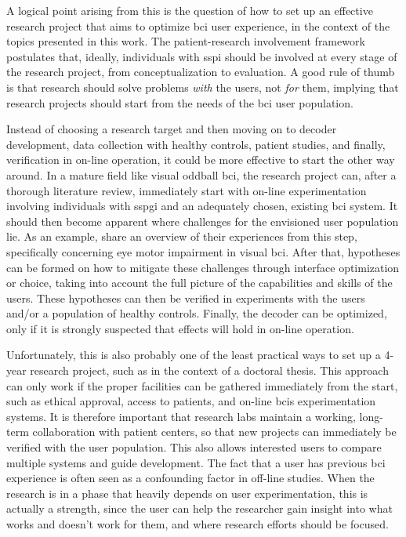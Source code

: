 A logical point arising from this is the question of how to set up an
effective research project that aims to optimize \ac{bci} user experience, in
the context of the topics presented in this work.
The patient-research involvement framework postulates that, ideally, individuals with
\ac{sspi} should be involved at every stage of the research project, from conceptualization
to evaluation.
A good rule of thumb is that research should solve problems \emph{with} the
users, not \emph{for} them, implying that research projects should start from
the needs of the \ac{bci} user population.

Instead of choosing a research target and then moving on to decoder
development, data collection with healthy controls, patient studies, and
finally, verification in on-line operation, it could be more effective to start
the other way around.
In a mature field like visual oddball \ac{bci}, the research project can, after
a thorough literature review, immediately start with on-line experimentation
involving individuals with \ac{sspgi} and an adequately chosen, existing \ac{bci} system.
It should then become apparent where challenges for the envisioned user
population lie.
As an example, \textcite{FriedOken2020} share an overview of their experiences from this step,
specifically concerning eye motor impairment in visual \ac{bci}.
After that, hypotheses can be formed on how to mitigate these challenges
through interface optimization or choice, taking into account the full picture
of the capabilities and skills of the users.
These hypotheses can then be verified in experiments
with the users and/or a population of healthy controls.
Finally, the decoder can be optimized, only if it is strongly suspected that
effects will hold in on-line operation.

Unfortunately, this is also probably one of the least practical ways to set up
a 4-year research project, such as in the context of a doctoral thesis.
This approach can only work if the proper facilities can be gathered immediately
from the start, such as ethical approval, access to patients, and on-line \acp{bci}
experimentation systems.
It is therefore important that research labs maintain a working, long-term
collaboration with patient centers, so that new projects can immediately be
verified with the user population. This also allows interested users to compare
multiple systems and guide development.
The fact that a user has previous \ac{bci} experience is often seen as a confounding
factor in off-line studies.
When the research is in a phase that heavily depends on user
experimentation, this is actually a strength, since the user can help the researcher gain
insight into what works and doesn’t work for them, and where research efforts
should be focused.

